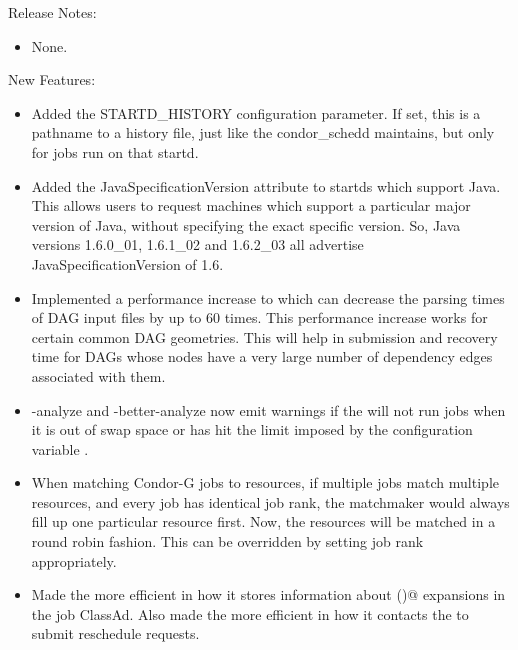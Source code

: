 \noindent Release Notes:

\begin{itemize}

\item None.

\end{itemize}


\noindent New Features:

\begin{itemize}

\item Added the STARTD\_HISTORY configuration parameter.  If set, this
is a pathname to a history file, just like the condor\_schedd maintains,
but only for jobs run on that startd.

\item Added the JavaSpecificationVersion attribute to startds which
support Java.  This allows users to request machines which support
a particular major version of Java, without specifying the exact
specific version.  So, Java versions 1.6.0\_01, 1.6.1\_02 and 1.6.2\_03
all advertise JavaSpecificationVersion of 1.6.

\item Implemented a performance increase to  which can
decrease the parsing times of DAG input files by up to 60 times.
This performance increase works for certain common DAG geometries.
This will help in submission and recovery
time for DAGs whose nodes have a very large number of dependency edges
associated with them.

\item {} -analyze and -better-analyze now emit warnings
if the  will not run jobs when it is out of swap space or
has hit the limit imposed by the configuration variable
.

\item When matching Condor-G jobs to resources, if multiple jobs
match multiple resources, and every job has identical job rank, the
matchmaker would always fill up one particular resource first.  Now,
the resources will be matched in a round robin fashion.  This can be
overridden by setting job rank appropriately.

\item Made the  more efficient in how it stores
information about \verb@$$()@ expansions in the job ClassAd.
Also made the  more efficient in how it contacts
the  to submit reschedule requests.


\end{itemize}
